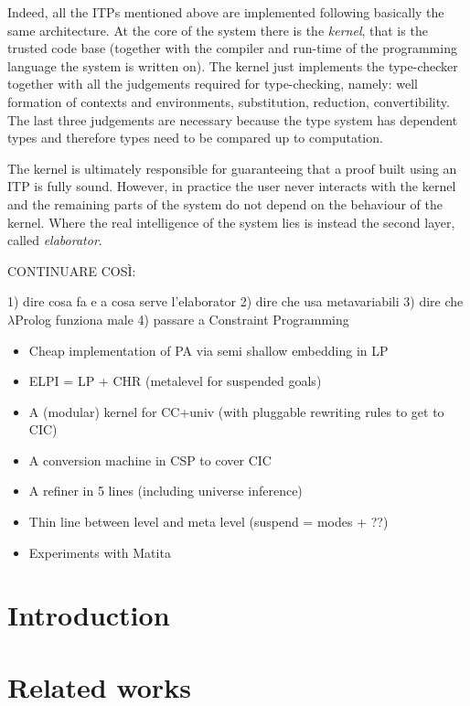\documentclass{easychair}
\begin{document}
Indeed, all the ITPs mentioned above are implemented following basically the same architecture. At the core of the system there is the \emph{kernel}, that is the trusted code base (together with the compiler and run-time of the programming language the system is written on). The kernel just implements the type-checker together with all the judgements required for type-checking, namely: well formation of contexts and environments, substitution, reduction, convertibility. The last three judgements are necessary because the type system has dependent types and therefore types need to be compared up to computation.

The kernel is ultimately responsible for guaranteeing that a proof built using an ITP is fully sound. However, in practice the user never interacts with the kernel and the remaining parts of the system do not depend on the behaviour of the kernel. Where the real intelligence of the system lies is instead the second layer, called \emph{elaborator}.

CONTINUARE COSÌ:

1) dire cosa fa e a cosa serve l'elaborator
2) dire che usa metavariabili
3) dire che $\lambda$Prolog funziona male
4) passare a Constraint Programming

\begin{itemize}
\item Cheap implementation of PA via semi shallow embedding in LP
\item ELPI = LP + CHR (metalevel for suspended goals)
\item A (modular) kernel for CC+univ (with pluggable rewriting rules to get to CIC)
\item A conversion machine in CSP to cover CIC
\item A refiner in 5 lines (including universe inference)
\item Thin line between level and meta level (suspend = modes + ??)
\item Experiments with Matita
\end{itemize}


\section{Introduction}

\section{Related works}

\label{sect:bib}


\end{document}
